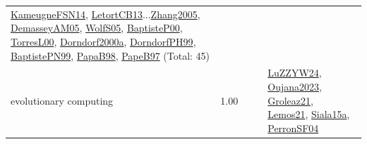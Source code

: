 {\begin{longtable}{p{3cm}r>{\raggedright\arraybackslash}p{6cm}>{\raggedright\arraybackslash}p{6cm}>{\raggedright\arraybackslash}p{8cm}}
\hyperref[detail:KameugneFSN14]{KameugneFSN14}, \hyperref[detail:LetortCB13]{LetortCB13}...\hyperref[detail:Zhang2005]{Zhang2005}, \hyperref[detail:DemasseyAM05]{DemasseyAM05}, \hyperref[detail:WolfS05]{WolfS05}, \hyperref[detail:BaptisteP00]{BaptisteP00}, \hyperref[detail:TorresL00]{TorresL00}, \hyperref[detail:Dorndorf2000a]{Dorndorf2000a}, \hyperref[detail:DorndorfPH99]{DorndorfPH99}, \hyperref[detail:BaptistePN99]{BaptistePN99}, \hyperref[detail:PapaB98]{PapaB98}, \hyperref[detail:PapeB97]{PapeB97} (Total: 45)\\
\index{evolutionary computing}\index{Algorithms!evolutionary computing}evolutionary computing &  1.00 &  &  & \hyperref[detail:LuZZYW24]{LuZZYW24}, \hyperref[detail:Oujana2023]{Oujana2023}, \hyperref[detail:Groleaz21]{Groleaz21}, \hyperref[detail:Lemos21]{Lemos21}, \hyperref[detail:Siala15a]{Siala15a}, \hyperref[detail:PerronSF04]{PerronSF04}\\

\end{longtable}}
